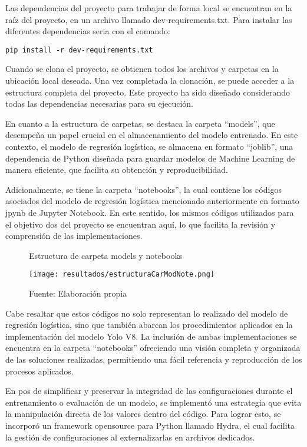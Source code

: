Las dependencias del proyecto para trabajar de forma local se encuentran en la raíz del proyecto, en un archivo llamado dev-requirements.txt. Para instalar las diferentes dependencias seria con el comando: 
\begin{verbatim}
pip install -r dev-requirements.txt
\end{verbatim}

Cuando se clona el proyecto, se obtienen todos los archivos y carpetas en la ubicación local deseada. Una vez completada la clonación, se puede acceder a la estructura completa del proyecto. Este proyecto ha sido diseñado considerando todas las dependencias necesarias para su ejecución. \newline

En cuanto a la estructura de carpetas, se destaca la carpeta ``models'', que desempeña un papel crucial en el almacenamiento del modelo entrenado. En este contexto, el modelo de regresión logística, se almacena en formato “joblib”, una dependencia de Python diseñada para guardar modelos de Machine Learning de manera eficiente, que facilita su obtención y reproducibilidad. \newline

Adicionalmente, se tiene la carpeta ``notebooks'', la cual contiene los códigos asociados del modelo de regresión logística mencionado anteriormente en formato jpynb de Jupyter Notebook. En este sentido, los mismos códigos utilizados para el objetivo dos del proyecto se encuentran aquí, lo que facilita la revisión y comprensión de las implementaciones.


\begin{figure}[h]
\centering
\caption{Estructura de carpeta models y notebooks}
\texttt{[image: resultados/estructuraCarModNote.png]}
\caption*{\footnotesize Fuente: Elaboración propia}
\label{fig:figuraEstructuraCarModNote}
\end{figure}

\newpage

Cabe resaltar que estos códigos no solo representan lo realizado del modelo de regresión logística, sino que también abarcan los procedimientos aplicados en la implementación del modelo Yolo V8. La inclusión de ambas implementaciones se encuentra en la carpeta ``notebooks'' ofreciendo una visión completa y organizada de las soluciones realizadas, permitiendo una fácil referencia y reproducción de los procesos aplicados. \newline

En pos de simplificar y preservar la integridad de las configuraciones durante el entrenamiento o evaluación de un modelo, se implementó una estrategia que evita la manipulación directa de los valores dentro del código. Para lograr esto, se incorporó un framework opensource para Python llamado Hydra, el cual facilita la gestión de configuraciones al externalizarlas en archivos dedicados.

